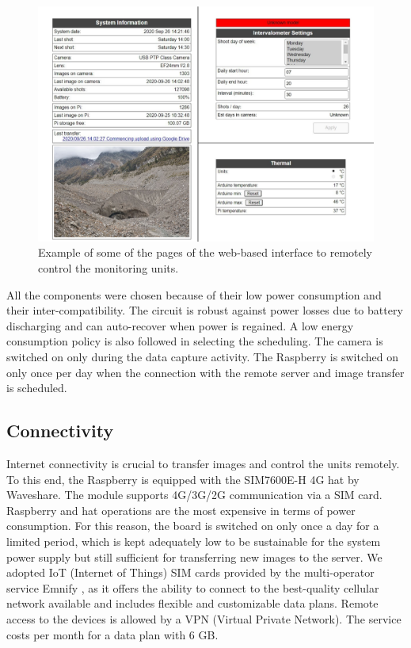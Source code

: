 \begin{figure}[ht!]
  \centering
  \includegraphics[width=1\textwidth]{web_interface.png}
  \caption{Example of some of the pages of the web-based interface to remotely control
    the monitoring units.}
  \label{fig:4:web-interface}
\end{figure}

All the components were chosen because of their low power consumption and their
inter-compatibility. 
The circuit is robust against power losses due to battery discharging and can auto-recover when power is regained. 
A low energy consumption policy is also followed in selecting the scheduling. 
The camera is switched on only during the data capture activity. 
The Raspberry is switched on only once per day when the connection with the remote server and image transfer is scheduled.

\subsection{Connectivity}\label{Connectivity}
Internet connectivity is crucial to transfer images and control the units remotely. 
To this end, the Raspberry is equipped with the SIM7600E-H 4G hat by Waveshare.
The module supports 4G/3G/2G communication via a SIM card. Raspberry and hat operations are the most expensive in terms of power consumption. 
For this reason, the board is switched on only
once a day for a limited period, which is kept adequately low to be sustainable for the system power supply but still sufficient for transferring new images to the server. 
We adopted IoT (Internet of Things) SIM cards provided by the multi-operator service Emnify \citep{emnify}, as it offers the ability to connect to the best-quality cellular network available and includes flexible and customizable data plans.
Remote access to the devices is allowed by a VPN (Virtual Private Network).
The service costs  per month for a data plan with 6 GB.

